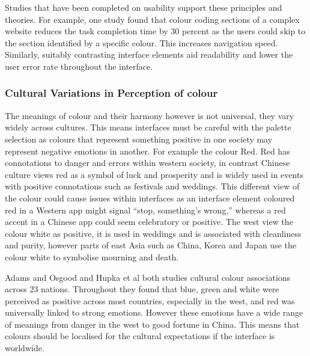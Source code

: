 \documentclass[]{project_final}
\begin{document}
Studies that have been completed on usability support these principles and theories. For example, one study found that colour coding sections of a complex website reduces the task completion time by 30 percent as the users could skip to the section identified by a specific colour. This increases navigation speed. Similarly, suitably contrasting interface elements aid readability and lower the user error rate throughout the interface.

\subsubsection{Cultural Variations in Perception of colour}

The meanings of colour and their harmony however is not universal, they vary widely across cultures. This means interfaces must be careful with the palette selection as colours that represent something positive in one society may represent negative emotions in another. For example the colour Red. Red has connotations to danger and errors within western society, in contrast Chinese culture views red as a symbol of luck and prosperity and is widely used in events with positive connotations such as festivals and weddings. This different view of the colour could cause issues within interfaces as an interface element coloured red in a Western app might signal “stop, something’s wrong,” whereas a red accent in a Chinese app could seem celebratory or positive. The west view the colour white as positive, it is used in weddings and is associated with cleanliness and purity, however parts of east Asia such as China, Korea and Japan use the colour white to symbolise mourning and death.


Adams and Osgood and Hupka et al both studies cultural colour associations across 23 nations. Throughout they found that blue, green and white were perceived as positive across most countries, especially in the west, and red was universally linked to strong emotions. However these emotions have a wide range of meanings from danger in the west to good fortune in China. This means that colours should be localised for the cultural expectations if the interface is worldwide.
\end{document}
